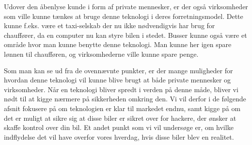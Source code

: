 Udover den åbenlyse kunde i form af private mennesker, er der også virksomheder som ville kunne tænkes at bruge denne teknologi i deres forretningsmodel. Dette kunne f.eks. være et taxi-selskab der nu ikke nødvendigvis har brug for chauffører, da en computer nu kan styre bilen i stedet. Busser kunne også være et område hvor man kunne benytte denne teknologi. Man kunne her igen spare lønnen til chaufføren, og virksomhederne ville kunne spare penge.

Som man kan se ud fra de ovennævnte punkter, er der mange muligheder for hvordan denne teknologi vil kunne blive brugt at både private mennesker og virksomheder. Når en teknologi bliver spredt i verden på denne måde, bliver vi nødt til at kigge nærmere på sikkerheden omkring den. Vi vil derfor i de følgende afsnit fokusere på om teknologien er klar til markedet endnu, samt kigge på om det er muligt at sikre sig at disse biler er sikret over for hackere, der ønsker at skaffe kontrol over din bil. Et andet punkt som vi vil undersøge er, om hvilke indflydelse det vil have overfor vores hverdag, hvis disse biler blev en realitet. 